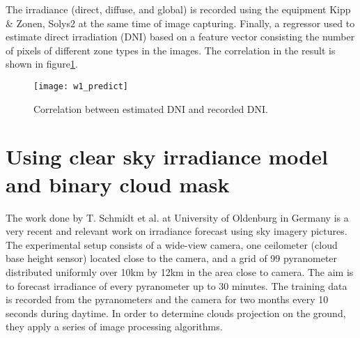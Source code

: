 The irradiance (direct, diffuse, and global) is recorded using the equipment Kipp \& Zonen, Solys2 at the same time of image capturing. Finally, a regressor used to estimate direct irradiation (DNI) based on a feature vector consisting the number of pixels of different zone types in the images. The correlation in the result is shown in figure\ref{fig:w1_predict}.

\begin{figure}[h]
\caption{Correlation between estimated DNI and recorded DNI.}
\label{fig:w1_predict}
\texttt{[image: w1\_predict]}
\centering
\end{figure} 

\section{Using clear sky irradiance model and binary cloud mask}
The work done by T. Schmidt et al.\cite{tSchmidt_full} at University of Oldenburg in Germany is a very recent and relevant work on irradiance forecast using sky imagery pictures. The experimental setup consists of a wide-view camera, one ceilometer (cloud base height sensor) located close to the camera, and a grid of 99 pyranometer distributed uniformly over 10km by 12km in the area close to camera. The aim is to forecast irradiance of every pyranometer up to 30 minutes. The training data is recorded from the pyranometers and the camera for two months every 10 seconds during daytime.
In order to determine clouds projection on the ground, they apply a series of image processing algorithms. 
